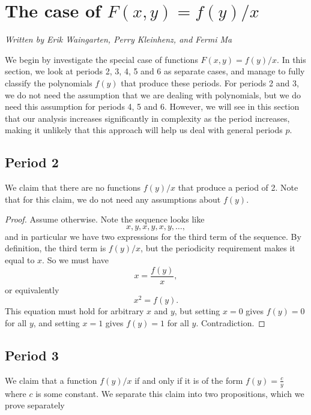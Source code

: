 \documentclass[12pt]{article}
\begin{document}
\section{The case of $F(x,y) = f(y)/x$}
\label{f(y)/x case}
\emph{Written by Erik Waingarten, Perry Kleinhenz, and Fermi Ma}

We begin by investigate the special case of functions $F(x,y) = f(y)/x$. In this section, we look at periods 2, 3, 4, 5 and 6 as separate cases, and manage to fully classify the polynomials $f(y)$ that produce these periods. For periods 2 and 3, we do not need the assumption that we are dealing with polynomials, but we do need this assumption for periods 4, 5 and 6. However, we will see in this section that our analysis increases significantly in complexity as the period increases, making it unlikely that this approach will help us deal with general periods $p$.

\subsection{Period 2}

We claim that there are no functions $f(y)/x$ that produce a period of 2. Note that for this claim, we do not need any assumptions about $f(y)$.

\begin{proof}
Assume otherwise. Note the sequence looks like
\[ x,y,x,y,x,y,\dots , \]
and in particular we have two expressions for the third term of the sequence. By definition, the third term is $f(y)/x$, but the periodicity requirement makes it equal to $x$. So we must have
\begin{equation*}
x = \frac{f(y)}{x},
\end{equation*}
or equivalently
\begin{equation*}
x^2 = f(y).
\end{equation*}
This equation must hold for arbitrary $x$ and $y$, but setting $x = 0$ gives $f(y) = 0$ for all $y$, and setting $x = 1$ gives $f(y) = 1$ for all $y$. Contradiction.
\end{proof}

\subsection{Period 3}

We claim that a function $f(y)/x$ if and only if it is of the form $f(y) = \frac{c}{y}$ where $c$ is some constant. We separate this claim into two propositions, which we prove separately
\end{document}

